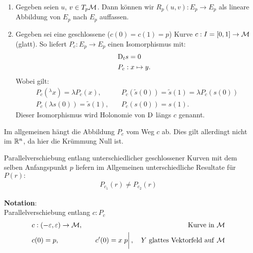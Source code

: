 \begin{enumerate}
\item Gegeben seien $u$, $v \in T_p \mathcal{M}$.
Dann können wir $R_p (u, v) : E_p \to E_p$ als lineare Abbildung von $E_p$ nach $E_p$ auffassen.
\item Gegeben sei eine geschlossene ($c(0)= c(1) = p$) Kurve $c : I=[ 0, 1 ] \to \mathcal{M}$ (glatt).
So liefert $P_c : E_p \to E_p$ einen Isomorphismus mit:
\begin{align}
&\mathrm{D}_t s = 0\\
&P_c : x \mapsto y.
\end{align}
Wobei gilt:
\begin{align}
&P_c (^\lambda x) = \lambda P_c (x), \quad &P_c (\tilde{s}(0)) = \tilde{s}(1) = \lambda P_c(s(0))\\
&P_c(\lambda s(0)) = \tilde{s}(1), \quad & P_c (s(0)) = s(1).
\end{align}
Dieser Isomorphismus wird Holonomie von $\mathrm{D}$ längs $c$ genannt.
\end{enumerate}
\begin{bem}
Im allgemeinen hängt die Abbildung $P_c$ vom Weg $c$ ab. 
Dies gilt allerdingt nicht im $\mathbb{R}^n$, da hier die Krümmung Null ist.
\end{bem}
Parallelverschiebung entlang unterschiedlicher geschlossener Kurven mit dem selben Anfangspunkt $p$ liefern im Allgemeinen unterschiedliche Resultate für $P(r): $
\begin{align}
P_{c_1} (r) \neq P_{c_2}(r)
\end{align}

\textbf{Notation}:\\
Parallelverschiebung entlang $c: P_c$
\begin{align}
& c: (-\epsilon, \epsilon) \to \mfk, \quad &\mathrm{Kurve \ in } \ \mfk \\
&c(0)= p, \quad &c'(0)=x \eval{p}, \quad Y \ \mathrm{glattes \ Vektorfeld \ auf} \  \mfk
\end{align}


